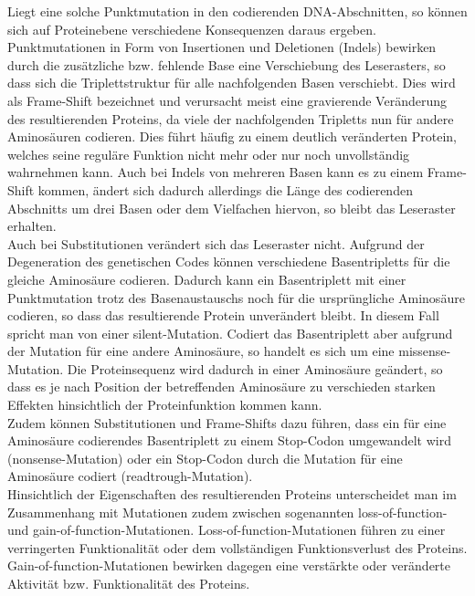 Liegt eine solche Punktmutation in den codierenden DNA-Abschnitten, so können sich auf Proteinebene verschiedene Konsequenzen daraus ergeben. Punktmutationen in Form von Insertionen und Deletionen (Indels) bewirken durch die zusätzliche bzw. fehlende Base eine Verschiebung des Leserasters, so dass sich die Triplettstruktur für alle nachfolgenden Basen verschiebt. Dies wird als Frame-Shift bezeichnet und verursacht meist eine gravierende Veränderung des resultierenden Proteins, da viele der nachfolgenden Tripletts nun für andere Aminosäuren codieren. Dies führt häufig zu einem deutlich veränderten Protein, welches seine reguläre Funktion nicht mehr oder nur noch unvollständig wahrnehmen kann. Auch bei Indels von mehreren Basen kann es zu einem Frame-Shift kommen, ändert sich dadurch allerdings die Länge des codierenden Abschnitts um drei Basen oder dem Vielfachen hiervon, so bleibt das Leseraster erhalten. \\

Auch bei Substitutionen verändert sich das Leseraster nicht. Aufgrund der Degeneration des genetischen Codes können verschiedene Basentripletts für die gleiche Aminosäure codieren. Dadurch kann ein Basentriplett mit einer Punktmutation trotz des Basenaustauschs noch für die ursprüngliche Aminosäure codieren, so dass das resultierende Protein unverändert bleibt. In diesem Fall spricht man von einer silent-Mutation. Codiert das Basentriplett aber aufgrund der Mutation für eine andere Aminosäure, so handelt es sich um eine missense-Mutation. Die Proteinsequenz wird dadurch in einer Aminosäure geändert, so dass es je nach Position der betreffenden Aminosäure zu verschieden starken Effekten hinsichtlich der Proteinfunktion kommen kann. \\

Zudem können Substitutionen und Frame-Shifts dazu führen, dass ein für eine Aminosäure codierendes Basentriplett zu einem Stop-Codon umgewandelt wird (nonsense-Mutation) oder ein Stop-Codon durch die Mutation für eine Aminosäure codiert (readtrough-Mutation). \\

Hinsichtlich der Eigenschaften des resultierenden Proteins unterscheidet man im Zusammenhang mit Mutationen zudem zwischen sogenannten loss-of-function- und gain-of-function-Mutationen. Loss-of-function-Mutationen führen zu einer verringerten Funktionalität oder dem vollständigen Funktionsverlust des Proteins. Gain-of-function-Mutationen bewirken dagegen eine verstärkte oder veränderte Aktivität bzw. Funktionalität des Proteins. \\

